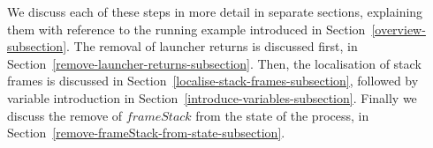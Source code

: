 We discuss each of these steps in more detail in separate sections,
explaining them with reference to the running example introduced in
Section~\ref{overview-subsection}.
The removal of launcher returns is discussed first, in
Section~\ref{remove-launcher-returns-subsection}.
Then, the localisation of stack frames is discussed in
Section~\ref{localise-stack-frames-subsection}, followed by variable
introduction in Section~\ref{introduce-variables-subsection}.
Finally we discuss the remove of $frameStack$ from the state of the
process, in Section~\ref{remove-frameStack-from-state-subsection}.

